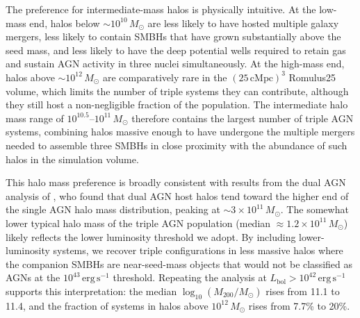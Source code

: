 \documentclass[twocolumn, 10pt]{article}
\begin{document}
The preference for intermediate-mass halos is physically intuitive. At the low-mass end, halos below $\sim 10^{10}\,M_\odot$ are less likely to have hosted multiple galaxy mergers, less likely to contain SMBHs that have grown substantially above the seed mass, and less likely to have the deep potential wells required to retain gas and sustain AGN activity in three nuclei simultaneously. At the high-mass end, halos above $\sim 10^{12}\,M_\odot$ are comparatively rare in the $(25\,\mathrm{cMpc})^3$ Romulus25 volume, which limits the number of triple systems they can contribute, although they still host a non-negligible fraction of the population. The intermediate halo mass range of $10^{10.5}$--$10^{11}\,M_\odot$ therefore contains the largest number of triple AGN systems, combining halos massive enough to have undergone the multiple mergers needed to assemble three SMBHs in close proximity with the abundance of such halos in the simulation volume.
 
This halo mass preference is broadly consistent with results from the dual AGN analysis of \citet{Saeedzadeh2024}, who found that dual AGN host halos tend toward the higher end of the single AGN halo mass distribution, peaking at $\sim 3 \times 10^{11}\,M_\odot$. The somewhat lower typical halo mass of the triple AGN population (median $\approx 1.2 \times 10^{11}\,M_\odot$) likely reflects the lower luminosity threshold we adopt. By including lower-luminosity systems, we recover triple configurations in less massive halos where the companion SMBHs are near-seed-mass objects that would not be classified as AGNs at the $10^{43}\,\mathrm{erg\,s^{-1}}$ threshold. Repeating the analysis at $L_\mathrm{bol} > 10^{42}\,\mathrm{erg\,s^{-1}}$ supports this interpretation: the median $\log_{10}(M_{200}/M_\odot)$ rises from 11.1 to 11.4, and the fraction of systems in halos above $10^{12}\,M_\odot$ rises from 7.7\% to 20\%.
 
\end{document}
